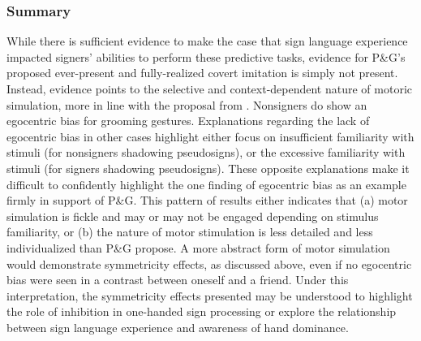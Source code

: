         \subsubsection{Summary} 
            While there is sufficient evidence to make the case that sign language experience impacted signers’ abilities to perform these predictive tasks, evidence for P\&G’s proposed ever-present and fully-realized covert imitation is simply not present. Instead, evidence points to the selective and context-dependent nature of motoric simulation, more in line with the proposal from . Nonsigners do show an egocentric bias for grooming gestures. Explanations regarding the lack of egocentric bias in other cases highlight either focus on insufficient familiarity with stimuli (for nonsigners shadowing pseudosigns), or the excessive familiarity with stimuli (for signers shadowing pseudosigns). These opposite explanations make it difficult to confidently highlight the one finding of egocentric bias as an example firmly in support of P\&G. This pattern of results either indicates that (a) motor simulation is fickle and may or may not be engaged depending on stimulus familiarity, or (b) the nature of motor stimulation is less detailed and less individualized than P\&G propose. A more abstract form of motor simulation would demonstrate symmetricity effects, as discussed above, even if no egocentric bias were seen in a contrast between oneself and a friend. Under this interpretation, the symmetricity effects presented may be understood to highlight the role of inhibition in one-handed sign processing or explore the relationship between sign language experience and awareness of hand dominance. 
